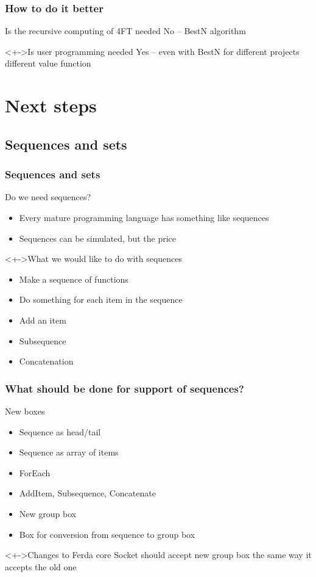 \documentclass{beamer}
\begin{document}
\begin{frame}
	\frametitle{How to do it better}
	\begin{block}{Is the recursive computing of 4FT needed}
		\pause No -- BestN algorithm
	\end{block}
	\begin{block}<+->{Is user programming needed}
		\pause Yes -- even with BestN for different projects different value function
	\end{block}
\end{frame}

\section{Next steps}
\subsection{Sequences and sets}
\begin{frame}
	\frametitle{Sequences and sets}
	\begin{block}{Do we need sequences?}
		\begin{itemize}[<+->]
			\item Every mature programming language has something like sequences
			\item Sequences can be simulated, but the price
		\end{itemize}	
	\end{block}
	\begin{block}<+->{What we would like to do with sequences}
		\begin{itemize}[<+->]
			\item Make a sequence of functions
			\item Do something for each item in the sequence
			\item Add an item
			\item Subsequence
			\item Concatenation 
		\end{itemize}	
	\end{block}
\end{frame}

\begin{frame}
	\frametitle{What should be done for support of sequences?}
	\begin{block}{New boxes}
		\begin{itemize}[<+->]
			\item Sequence as head/tail
			\item Sequence as array of items
			\item ForEach
			\item AddItem, Subsequence, Concatenate
			\item New group box
			\item Box for conversion from sequence to group box
		\end{itemize}	
	\end{block}
	\begin{block}<+->{Changes to Ferda core}
		\pause Socket should accept new group box the same way it accepts the old one
	\end{block}
\end{frame}
\end{document}
